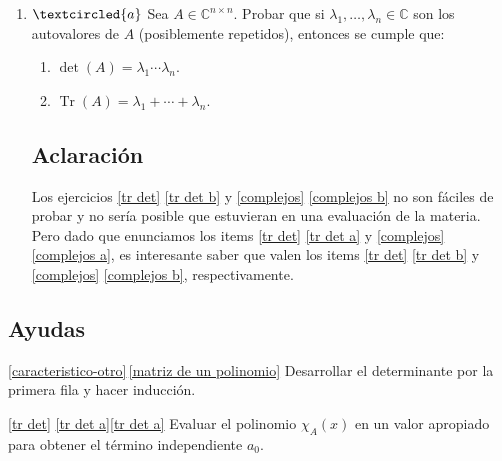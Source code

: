 \begin{enumerate}[resume,topsep=6pt,itemsep=.4cm]
\item\label{complejos} $\textcircled{a}$  Sea $A\in\mathbb{C}^{n\times n}$. Probar que si $\lambda_1,\dots,\lambda_n \in \mathbb C$ son los autovalores de $A$
(posiblemente repetidos), entonces se cumple que:
\begin{enumerate}
    \item\label{complejos a} $\det(A)=\lambda_1\cdots \lambda_n$.
    \item\label{complejos b} $\operatorname{Tr}(A)=\lambda_1+\cdots+\lambda_n$.
\end{enumerate}

\subsection*{Aclaración}
Los ejercicios \ref{tr det}  \ref{tr det b} y \ref{complejos}  \ref{complejos b} no son fáciles de probar y no sería posible que estuvieran en una evaluación de la materia. Pero dado que enunciamos los items  \ref{tr det}  \ref{tr det a} y \ref{complejos}  \ref{complejos a}, es interesante saber que valen los items  \ref{tr det}  \ref{tr det b} y \ref{complejos}  \ref{complejos b}, respectivamente.
%
%

\end{enumerate}


\subsection*{Ayudas}

\ref{caracteristico-otro}\,\ref{matriz de un polinomio} Desarrollar el determinante por la primera fila y hacer inducción.


\ref{tr det} \ref{tr det a}\ref{tr det a} Evaluar el polinomio $\chi_A(x)$ en un valor apropiado para obtener el término independiente $a_0$.


